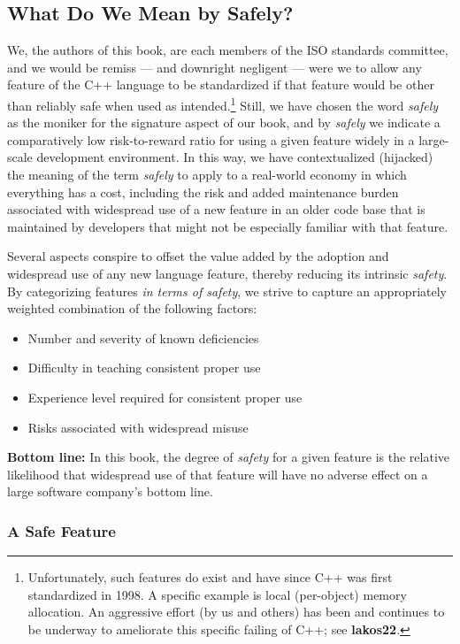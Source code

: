 \subsection[What Do We Mean by {\sffamily\itshape Safely}?]{What Do We Mean by {\sfbsubsecitalRomeo Safely}?}
We, the authors of this book, are each members of the ISO standards committee, and we would be remiss --- and downright negligent --- were we to allow any feature of the C++ language to be standardized if that feature would be other than reliably safe when used as intended.\footnote{Unfortunately, such features do exist and have since C++ was first standardized in 1998. A specific example is local (per-object) memory allocation. An aggressive effort (by us and others) has been and continues to be underway to ameliorate this specific failing of C++; see \textbf{lakos22}.} Still, we have chosen the word \textit{safely} as the moniker for the signature aspect of our book, and by \textit{safely} we indicate a comparatively low risk-to-reward ratio for using a given feature widely in a large-scale development environment. In this way, we have contextualized (hijacked) the meaning of the term \textit{safely} to apply to a real-world economy in which everything has a cost, including the risk and added maintenance burden associated with widespread use of a new feature in an older code base that is maintained by developers that might not be especially familiar with that feature. 

Several aspects conspire to offset the value added by the adoption and widespread use of any new language feature, thereby reducing its intrinsic \textit{safety}. By categorizing features \textit{in terms of safety}, we strive to capture an appropriately weighted combination of the following factors:
\begin{itemize}
\item{Number and severity of known deficiencies}
\item{Difficulty in teaching consistent proper use}
\item{Experience level required for consistent proper use}
\item{Risks associated with widespread misuse}
\end{itemize}
\textbf{Bottom line:} In this book, the degree of \textit{safety} for a given feature is the relative likelihood that widespread use of that feature will have no adverse effect on a large software company's bottom line.

\subsubsection[A {\it Safe} Feature]{A {\sfbsubsubsecitalRomeo Safe} Feature}


